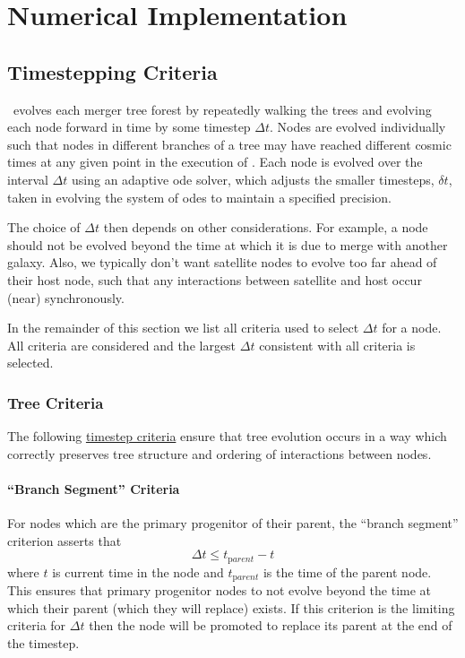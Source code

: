 \chapter{Numerical Implementation}

\section{Timestepping Criteria}\label{sec:TimesteppingCriteria}

\glc\ evolves each merger tree forest by repeatedly walking the trees and evolving each node forward in time by some timestep $\Delta t$. Nodes are evolved individually such that nodes in different branches of a tree may have reached different cosmic times at any given point in the execution of \glc. Each node is evolved over the interval $\Delta t$ using an adaptive \gls{ode} solver, which adjusts the smaller timesteps, $\delta t$, taken in evolving the system of \glspl{ode} to maintain a specified precision.

The choice of $\Delta t$ then depends on other considerations. For example, a node should not be evolved beyond the time at which it is due to merge with another galaxy. Also, we typically don't want satellite nodes to evolve too far ahead of their host node, such that any interactions between satellite and host occur (near) synchronously.

In the remainder of this section we list all criteria used to select $\Delta t$ for a node. All criteria are considered and the largest $\Delta t$ consistent with all criteria is selected.

\subsection{Tree Criteria}

The following \hyperlink{merger_trees.evolve.F90:merger_trees_evolve:evolve_to_time}{timestep criteria} ensure that tree evolution occurs in a way which correctly preserves tree structure and ordering of interactions between \glspl{node}.

\subsubsection{``Branch Segment'' Criteria}

For \glspl{node} which are the \gls{primary progenitor} of their \gls{parent}, the ``branch segment'' criterion asserts that
\begin{equation}
 \Delta t \le t_{\mathrm parent} - t
\end{equation}
where $t$ is current time in the \gls{node} and $t_{\mathrm parent}$ is the time of the \gls{parent} \gls{node}. This ensures that \gls{primary progenitor} \glspl{node} to not evolve beyond the time at which their \gls{parent} (which they will replace) exists.  If this criterion is the limiting criteria for $\Delta t$ then the \gls{node} will be promoted to replace its \gls{parent} at the end of the timestep. 

